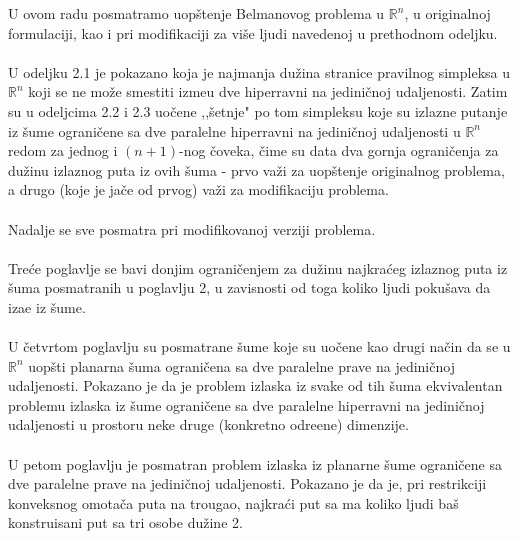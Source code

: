 \documentclass[11pt,letter]{article}
\begin{document}
\bigskip
U ovom radu posmatramo uop\v stenje Belmanovog problema u $\mathbb{R}^n$, u originalnoj formulaciji, kao i pri modifikaciji za vi\v se ljudi navedenoj u prethodnom odeljku.
\\
\\
\indent U odeljku 2.1 je pokazano koja je najmanja du\v zina stranice pravilnog simpleksa u $\mathbb{R}^n$ koji se ne mo\v ze smestiti izme\dj u dve hiperravni na jedini\v cnoj udaljenosti. Zatim su u odeljcima 2.2 i 2.3  uo\v cene ,,\v setnje" po tom simpleksu koje su izlazne putanje iz \v sume ograni\v cene sa dve paralelne hiperravni na jedini\v cnoj udaljenosti u $\mathbb{R}^n$ redom za jednog i $(n+1)$-nog \v coveka, \v cime su data dva gornja ograni\v cenja za du\v zinu izlaznog puta iz ovih \v suma - prvo va\v zi za uop\v stenje originalnog problema, a drugo (koje je ja\v ce od prvog) va\v zi za modifikaciju problema. 
\\
\\
\indent Nadalje se sve posmatra pri modifikovanoj verziji problema.
\\
\\
\indent Tre\' ce poglavlje se bavi donjim ograni\v cenjem za du\v zinu najkra\' ceg izlaznog puta iz \v suma posmatranih u poglavlju 2, u zavisnosti od toga koliko ljudi poku\v sava da iza\dj e iz \v sume.
\\
\\
\indent U \v cetvrtom poglavlju su posmatrane \v sume koje su uo\v cene kao drugi na\v cin da se u $\mathbb{R}^n$ uop\v sti planarna \v suma ograni\v cena sa dve paralelne prave na jedini\v cnoj udaljenosti. Pokazano je da je problem izlaska iz svake od tih \v suma ekvivalentan problemu izlaska iz \v sume ograni\v cene sa dve paralelne hiperravni na jedini\v cnoj udaljenosti u prostoru neke druge (konkretno odre\dj ene) dimenzije.
\\
\\
\indent U petom poglavlju je posmatran problem izlaska iz planarne \v sume ograni\v cene sa dve paralelne prave na jedini\v cnoj udaljenosti. Pokazano je da je, pri restrikciji konveksnog omota\v ca puta na trougao, najkra\' ci put sa ma koliko ljudi ba\v s konstruisani put sa tri osobe du\v zine 2.
\\
\end{document}
